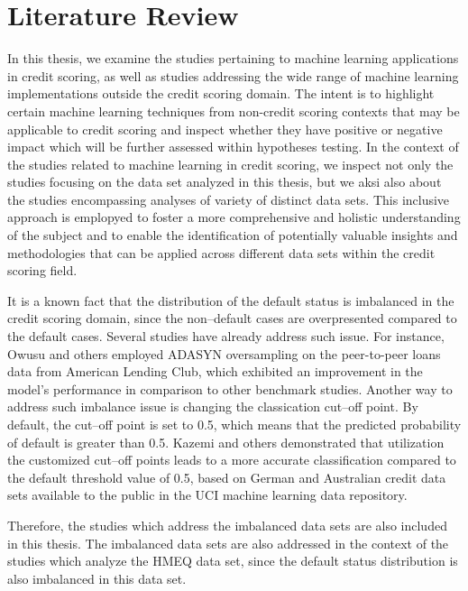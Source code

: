 \chapter{Literature Review}
\label{chap:three}

In this thesis, we examine the studies pertaining to machine learning applications in credit scoring, as well as studies addressing the wide range of machine learning implementations outside the credit scoring domain. The intent is to highlight certain machine learning techniques from non-credit scoring contexts that may be applicable to credit scoring and inspect whether they have positive or negative impact which will be further assessed within hypotheses testing.
In the context of the studies related to machine learning in credit scoring, we inspect not only the studies focusing on the data set analyzed in this thesis, but we aksi  also about the studies encompassing analyses of variety of distinct data sets.
This inclusive approach is emplopyed to foster a more comprehensive and holistic understanding of the subject and to enable the identification of potentially valuable insights and methodologies that can be applied across different data sets within the credit scoring field.

It is a known fact that the distribution of the default status is imbalanced in the credit scoring domain, since the non--default cases are overpresented compared to the default cases. Several studies have already address such issue.
For instance, Owusu and others \citep{owusu2023deep} employed ADASYN oversampling on the peer-to-peer loans data from American Lending Club, which exhibited an improvement in the model's performance in comparison to other benchmark studies.
Another way to address such imbalance issue is changing the classication cut--off point.
By default, the cut--off point is set to 0.5, which means that the predicted probability of default is greater than 0.5. Kazemi and others \citep{kazemi2023estimation} demonstrated that utilization the customized cut--off points leads to a more accurate classification compared to the default threshold value of 0.5, based on German and Australian credit data sets available to the public in the UCI machine learning data repository.


Therefore, the studies which address the imbalanced data sets are also included in this thesis. The imbalanced data sets are also addressed in the context of the studies which analyze the HMEQ data set, since the default status distribution is also imbalanced in this data set.

